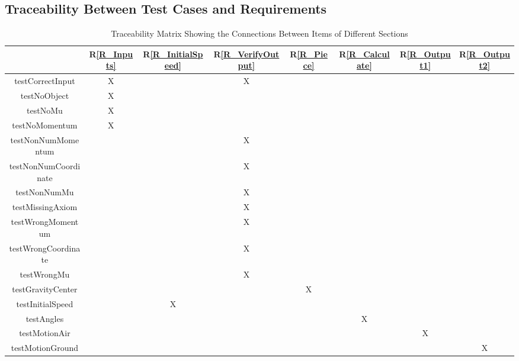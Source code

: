 \documentclass[12pt, titlepage]{article}
\newcommand{\rref}[1]{R\ref{#1}}
\begin{document}
\subsection{Traceability Between Test Cases and Requirements}

\begin{table}[h!]
	\centering
	\begin{tabular}{|c|c|c|c|c|c|c|c|}
		\hline        
		& \rref{R_Inputs} & \rref{R_InitialSpeed} & \rref{R_VerifyOutput}& \rref{R_Piece} &\rref{R_Calculate} & \rref{R_Output1}&\rref{R_Output2} \\
		\hline
		testCorrectInput &X & &X & & & &\\ \hline
		testNoObject &X & & & & & &\\ \hline
		testNoMu &X & & & & & &\\ \hline
		testNoMomentum &X & & & & & &\\ \hline
		testNonNumMomentum & & &X & & & &\\ \hline
		testNonNumCoordinate & & &X & & & &\\ \hline
		testNonNumMu & & &X & & & &\\ \hline
		testMissingAxiom & & &X & & & &\\ \hline
		testWrongMomentum & & &X & & & &\\ \hline
		testWrongCoordinate & & &X & & & &\\ \hline
		testWrongMu & & &X & & & &\\ \hline
		testGravityCenter & & & &X & & &\\ \hline
		testInitialSpeed & &X & & & & &\\ \hline
		testAngles & & & & &X & &\\ \hline
		testMotionAir & & & & & &X &\\ \hline
		testMotionGround & & & & & & &X\\ \hline
	\end{tabular}
	\caption{Traceability Matrix Showing the Connections Between Items of Different Sections}
	\label{Table:trace}
\end{table}

\newpage

		
\end{document}
